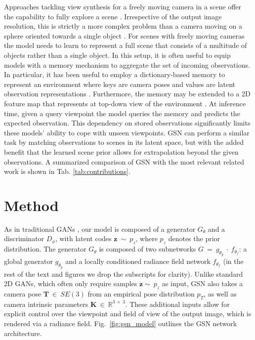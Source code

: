 \documentclass[10pt,twocolumn,letterpaper]{article}
\begin{document}
Approaches tackling view synthesis for a freely moving camera in a scene offer the capability to fully explore a scene \cite{gqn,gtmsm,iss}. Irrespective of the output image resolution, this is strictly a more complex problem than a camera moving on a sphere oriented towards a single object \cite{srn,appearanceflow,multiview2novelview,pixelnerf,graf,giraffe,pigan}. For scenes with freely moving cameras the model needs to learn to represent a full scene that consists of a multitude of objects rather than a single object. In this setup, it is often useful to equip models with a memory mechanism to aggregate the set of incoming observations. In particular, it has been useful to employ a dictionary-based memory to represent an environment where keys are camera poses and values are latent observation representations \cite{gtmsm}. Furthermore, the memory may be extended to a 2D feature map that represents at top-down view of the environment \cite{gqn,iss}. At inference time, given a query viewpoint the model queries the memory and predicts the expected observation. This dependency on stored observations significantly limits these models' ability to cope with unseen viewpoints. GSN can perform a similar task by matching observations to scenes in its latent space, but with the added benefit that the learned scene prior allows for extrapolation beyond the given observations. A summarized comparison of GSN with the most relevant related work is shown in Tab. \ref{tab:contributions}.


\section{Method}

 As in traditional GANs \cite{gan}, our model is composed of a generator $G_\theta$ and a discriminator $D_\phi$, with latent codes $\textbf{z}~\sim~p_z$, where $p_z$ denotes the prior distribution. The generator $G_\theta$ is composed of two subnetworks $G~=~g_{\theta_g}~\cdot~f_{\theta_f}$: a global generator $g_{\theta_g}$ and a locally conditioned radiance field network $f_{\theta_f}$ (in the rest of the text and figures we drop the subscripts for clarity). Unlike standard 2D GANs, which often only require samples $\textbf{z}\sim~p_z$ as input, GSN also takes a camera pose $\textbf{T}~\in~SE(3)$ from an empirical pose distribution $p_T$, as well as camera intrinsic parameters $\textbf{K}~\in~\mathbb{R}^{3~\times~3}$. These additional inputs allow for explicit control over the viewpoint and field of view of the output image, which is rendered via a radiance field. Fig.~\ref{fig:gsn_model} outlines the GSN network architecture.
\end{document}
